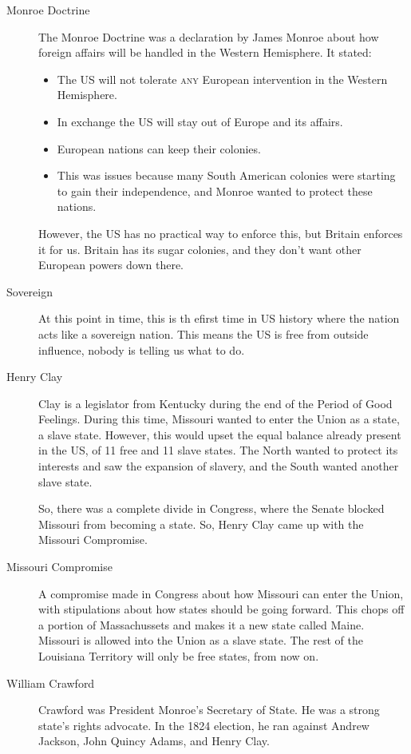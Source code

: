 \begin{description}
\item[Monroe Doctrine] The Monroe Doctrine was a declaration by James Monroe about how foreign affairs will be handled in the Western Hemisphere.
  It stated:
  \begin{itemize}[noitemsep]
  \item The US will not tolerate \textsc{any} European intervention in the Western Hemisphere.
  \item In exchange the US will stay out of Europe and its affairs.
  \item European nations can keep their colonies.
  \item This was issues because many South American colonies were starting to gain their independence, and Monroe wanted to protect these nations.
  \end{itemize}

  However, the US has no practical way to enforce this, but Britain enforces it for us.
  Britain has its sugar colonies, and they don't want other European powers down there.

\item[Sovereign] At this point in time, this is th efirst time in US history where the nation acts like a sovereign nation.
  This means the US is free from outside influence, nobody is telling us what to do.

\item[Henry Clay] Clay is a legislator from Kentucky during the end of the Period of Good Feelings.
  During this time, Missouri wanted to enter the Union as a state, a slave state.
  However, this would upset the equal balance already present in the US, of 11 free and 11 slave states.
  The North wanted to protect its interests and saw the expansion of slavery, and the South wanted another slave state.

  So, there was a complete divide in Congress, where the Senate blocked Missouri from becoming a state.
  So, Henry Clay came up with the Missouri Compromise.

\item[Missouri Compromise] A compromise made in Congress about how Missouri can enter the Union, with stipulations about how states should be going forward.
  This chops off a portion of Massachussets and makes it a new state called Maine.
  Missouri is allowed into the Union as a slave state.
  The rest of the Louisiana Territory will only be free states, from now on.

\item[William Crawford] Crawford was President Monroe's Secretary of State.
  He was a strong state's rights advocate.
  In the 1824 election, he ran against Andrew Jackson, John Quincy Adams, and Henry Clay.


\end{description}
